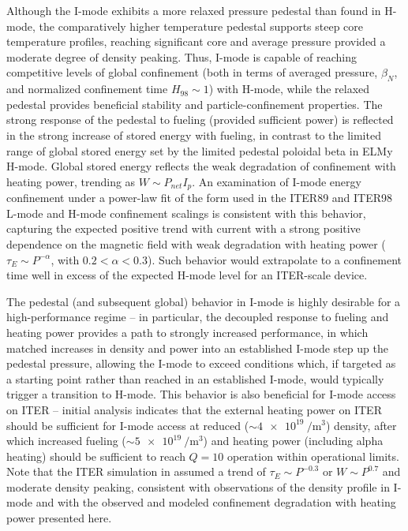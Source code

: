Although the I-mode exhibits a more relaxed pressure pedestal than found in H-mode, the comparatively higher temperature pedestal supports steep core temperature profiles, reaching significant core and average pressure provided a moderate degree of density peaking.  Thus, I-mode is capable of reaching competitive levels of global confinement (both in terms of averaged pressure, $\beta_N$, and normalized confinement time $H_{98} \sim 1$) with H-mode, while the relaxed pedestal provides beneficial stability and particle-confinement properties.  The strong response of the pedestal to fueling (provided sufficient power) is reflected in the strong increase of stored energy with fueling, in contrast to the limited range of global stored energy set by the limited pedestal poloidal beta in ELMy H-mode.  Global stored energy reflects the weak degradation of confinement with heating power, trending as $W \sim P_{net} I_p$.  An examination of I-mode energy confinement under a power-law fit of the form used in the ITER89 and ITER98 L-mode and H-mode confinement scalings is consistent with this behavior, capturing the expected positive trend with current with a strong positive dependence on the magnetic field with weak degradation with heating power ($\tau_E \sim P^{-\alpha}$, with $0.2 < \alpha < 0.3$).  Such behavior would extrapolate to a confinement time well in excess of the expected H-mode level for an ITER-scale device.

The pedestal (and subsequent global) behavior in I-mode is highly desirable for a high-performance regime -- in particular, the decoupled response to fueling and heating power provides a path to strongly increased performance, in which matched increases in density and power into an established I-mode step up the pedestal pressure, allowing the I-mode to exceed conditions which, if targeted as a starting point rather than reached in an established I-mode, would typically trigger a transition to H-mode.  This behavior is also beneficial for I-mode access on ITER -- initial analysis \cite{Whyte2011} indicates that the external heating power on ITER should be sufficient for I-mode access at reduced ($\sim \SI{4e19}{\per\meter\cubed}$) density, after which increased fueling ($\sim \SI{5e19}{\per\meter\cubed}$) and heating power (including alpha heating) should be sufficient to reach $Q=10$ operation within operational limits.  Note that the ITER simulation in \cite{Whyte2011} assumed a trend of $\tau_E \sim P^{-0.3}$ or $W \sim P^{0.7}$ and moderate density peaking, consistent with observations of the density profile in I-mode and with the observed and modeled confinement degradation with heating power presented here.\nicechapterending



